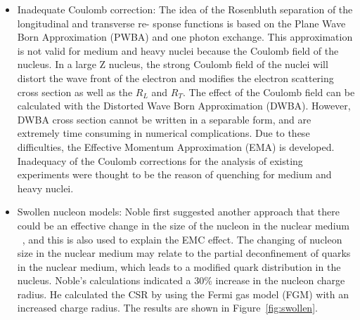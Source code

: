 \begin{itemize}
\item Inadequate Coulomb correction:
The idea of the Rosenbluth separation of the longitudinal and transverse re-
sponse functions is based on the Plane Wave Born Approximation (PWBA)
and one photon exchange. This approximation is not valid for medium and heavy nuclei 
because the Coulomb field of the nucleus. In a large Z nucleus, the strong Coulomb field
of the nuclei will distort the wave front of the electron and modifies the electron scattering
cross section as well as the $R_L$ and $R_T$.
The effect of the Coulomb field can be calculated with the Distorted Wave Born Approximation (DWBA).
However, DWBA cross section cannot be written in a separable form, and are extremely time consuming in
numerical complications. Due to these difficulties, the Effective Momentum Approximation (EMA) is developed.
Inadequacy of the Coulomb corrections for the analysis of existing experiments
were thought to be the reason of quenching for medium and heavy nuclei.

\item Swollen nucleon models: Noble first suggested  another approach that there could be
an effective change in the size of the nucleon in the nuclear medium  ~\cite{Noble1981},
and this is also used to explain the EMC effect.
The changing of nucleon size in the nuclear medium may relate to the partial
deconfinement of quarks in the nuclear medium, which leads to a modified
quark distribution in the nucleus. 
Noble's calculations indicated a 30\% increase in the nucleon charge radius. He calculated the CSR by
using the Fermi gas model (FGM) with an increased charge radius. The results are
shown in Figure~\ref{fig:swollen}.

\end{itemize}

